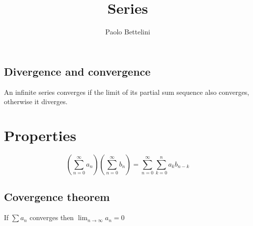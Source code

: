 \documentclass[a4paper]{article}
\title{Series}
\author{Paolo Bettelini}
\date{}
\begin{document}
\maketitle
\tableofcontents
\pagebreak

\subsection{Divergence and convergence}

An infinite series converges if the limit
of its partial sum sequence also converges,
otherwise it diverges.

\section{Properties}

\[
    \left(
        \sum_{n=0}^\infty a_n
    \right)
    \left(
        \sum_{n=0}^\infty b_n
    \right)
    =
    \sum_{n=0}^\infty \sum_{k=0}^n a_k b_{n-k}
\]

\subsection{Covergence theorem}

If \(\sum a_n\) converges then \(\lim_{n\to\infty}a_n=0\)

\pagebreak
\end{document}
